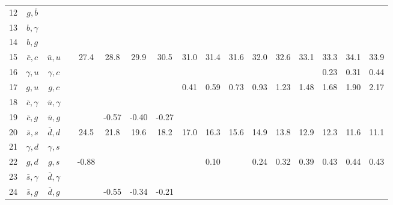 \begin{tabular}{rccc@{}S@{}S@{}S@{}S@{}S@{}S@{}S@{}S@{}S@{}S@{}S@{}S@{}S}
  12 & $g,\bar b$       &                  &                 &       &       &       &       &       &      &      &      &      &      &      &      &      \\
  13 & $b,\gamma$       &                  &                 &       &       &       &       &       &      &      &      &      &      &      &      &      \\
  14 & $b,g$            &                  &                 &       &       &       &       &       &      &      &      &      &      &      &      &      \\
  15 & $\bar c,c$       & $\bar u,u$       &                 &  27.4 &  28.8 &  29.9 &  30.5 &  31.0 & 31.4 & 31.6 & 32.0 & 32.6 & 33.1 & 33.3 & 34.1 & 33.9 \\
  16 & $\gamma, u$      & $\gamma, c$      &                 &       &       &       &       &       &      &      &      &      &      & 0.23 & 0.31 & 0.44 \\
  17 & $g,u$            & $g,c$            &                 &       &       &       &       &  0.41 & 0.59 & 0.73 & 0.93 & 1.23 & 1.48 & 1.68 & 1.90 & 2.17 \\
  18 & $\bar c,\gamma$  & $\bar u,\gamma$  &                 &       &       &       &       &       &      &      &      &      &      &      &      &      \\
  19 & $\bar c, g$      & $\bar u, g$      &                 &       &-0.57  & -0.40 & -0.27 &       &      &      &      &      &      &      &      &      \\
  20 & $\bar s, s$      & $\bar d, d$      &                 &  24.5 &  21.8 &  19.6 &  18.2 &  17.0 & 16.3 & 15.6 & 14.9 & 13.8 & 12.9 & 12.3 & 11.6 & 11.1 \\
  21 & $\gamma, d$      & $\gamma, s$      &                 &       &       &       &       &       &      &      &      &      &      &      &      &      \\
  22 & $g,d$            & $g,s$            &                 & -0.88 &       &       &       &       & 0.10 &      & 0.24 & 0.32 & 0.39 & 0.43 & 0.44 & 0.43 \\
  23 & $\bar s,\gamma$  & $\bar d,\gamma$  &                 &       &       &       &       &       &      &      &      &      &      &      &      &      \\
  24 & $\bar s,g$       & $\bar d, g$      &                 &       &-0.55  & -0.34 & -0.21 &       &      &      &      &      &      &      &      &      \\

\end{tabular}
